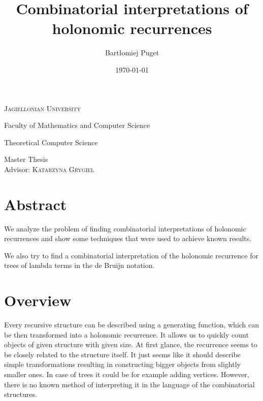 \documentclass[final]{article}
\title{Combinatorial interpretations of holonomic recurrences}
\author{Bartłomiej Puget}
\date{\today}
\theoremstyle{definition}
\theoremstyle{definition}
\theoremstyle{remark}
\begin{document}
\begin{titlepage}
	\begin{center}
	\textsc{\LARGE Jagiellonian University}

	\Large Faculty of Mathematics and Computer Science

	\Large Theoretical Computer Science

	\vfill

	\vspace{1cm}
	\hrulefill
	\vspace{0.5cm}

    \makeatletter
    \huge \textsc{\@title}
    \makeatother

	\vspace{0.2cm}
	\hrulefill

	\vspace{1cm}
    \makeatletter
	\textsc{\Large \@author}
    \makeatother

	\vspace{1cm}
    \normalsize

	Master Thesis\\
	Advisor: \textsc{Katarzyna Grygiel}

	\vfill

    \makeatletter
    \@date
    \makeatother
	\end{center}
\end{titlepage}

\section*{Abstract}%
\label{sec:abstract}

We analyze the problem of finding combinatorial interpretations of holonomic recurrences and show some techniques that were used to achieve known results.

We also try to find a combinatorial interpretation of the holonomic recurrence for trees of lambda terms in the de Bruijn notation.

\clearpage

\tableofcontents
\clearpage

\section{Overview}%

Every recursive structure can be described using a generating function, which can be then transformed into a holonomic recurrence. It allows us to quickly count objects of given structure with given size. At first glance, the recurrence seems to be closely related to the structure itself. It just seems like it should describe simple transformations resulting in constructing bigger objects from slightly smaller ones. In case of trees it could be for example adding vertices. However, there is no known method of interpreting it in the language of the combinatorial structures.
\end{document}
